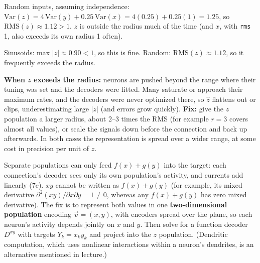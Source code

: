\documentclass[10pt,letterpaper]{article}
\newcommand{\ans}[1]{\par\vspace{3pt}{\bfseries #1}\quad}
\begin{document}
Random inputs, assuming independence: $\mathrm{Var}(z) = 4\,\mathrm{Var}(y) + 0.25\,\mathrm{Var}(x) = 4(0.25) + 0.25(1) = 1.25$, so $\mathrm{RMS}(z) \approx 1.12 > 1$. $z$ is outside the radius much of the time (and $x$, with \texttt{rms} 1, also exceeds its own radius 1 often).
\begin{result}
Sinusoids: max $|z| \approx 0.90 < 1$, so this is fine. Random: $\mathrm{RMS}(z) \approx 1.12$, so it frequently exceeds the radius.
\end{result}
\textbf{When $z$ exceeds the radius:} neurons are pushed beyond the range where their tuning was set and the decoders were fitted. Many saturate or approach their maximum rates, and the decoders were never optimized there, so $\hat z$ flattens out or clips, underestimating large $|z|$ (and errors grow quickly). \textbf{Fix:} give the $z$ population a larger radius, about 2--3 times the RMS (for example $r = 3$ covers almost all values), or scale the signals down before the connection and back up afterwards. In both cases the representation is spread over a wider range, at some cost in precision per unit of $z$.

\ans{7f.}
Separate populations can only feed $f(x) + g(y)$ into the target: each connection's decoder sees only its own population's activity, and currents add linearly (7e). $xy$ cannot be written as $f(x) + g(y)$ (for example, its mixed derivative $\partial^2(xy)/\partial x\partial y = 1 \ne 0$, whereas any $f(x) + g(y)$ has zero mixed derivative). The fix is to represent both values in one \textbf{two-dimensional population} encoding $\vec v = (x, y)$, with encoders spread over the plane, so each neuron's activity depends jointly on $x$ and $y$. Then solve for a function decoder $D^{xy}$ with targets $Y_k = x_k y_k$ and project into the $z$ population. (Dendritic computation, which uses nonlinear interactions within a neuron's dendrites, is an alternative mentioned in lecture.)
\end{document}
